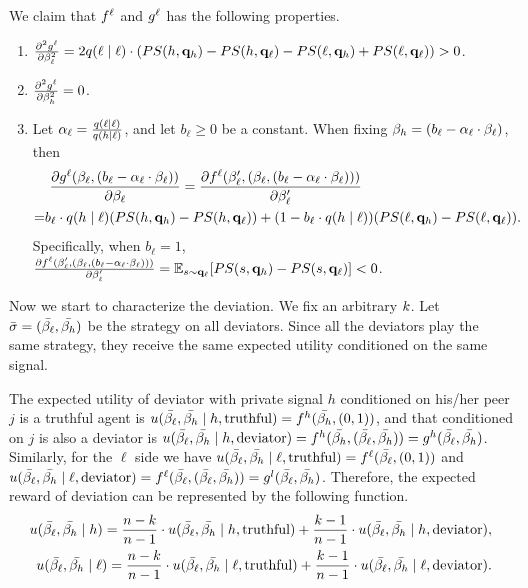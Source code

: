 \begin{claim}
We claim that $f^\ell$ and $g^\ell$ has the following properties. 
    \begin{enumerate}
        \item $\frac{\partial^2g^\ell}{\partial \beta_{\ell}^2} = 2q(\ell\mid \ell)\cdot (PS(h, \mathbf{q}_h) - PS(h, \mathbf{q}_\ell) - PS(\ell,\mathbf{q}_h) + PS(\ell, \mathbf{q}_\ell)) > 0$. 
        \item $\frac{\partial^2g^\ell}{\partial \beta_{h}^2} = 0$. 
        \item Let $\alpha_\ell = \frac{q(\ell \mid \ell)}{q(h \mid \ell)}$, and let $b_\ell \ge 0$ be a constant. When fixing $\beta_{h} = (b_\ell - \alpha_\ell 
 \cdot\beta_{\ell})$, then 
        \begin{align*}
        &\ \frac{\partial g^\ell(\beta_{\ell}, (b_\ell - \alpha_\ell 
        \cdot\beta_{\ell}))}{\partial \beta_{\ell}}= \frac{\partial f^\ell(\beta_{\ell}', (\beta_{\ell}, (b_\ell - \alpha_\ell 
        \cdot\beta_{\ell})))}{\partial \beta_{\ell}'}\\ =& b_\ell \cdot q(h\mid \ell)(PS(h, \mathbf{q}_h) - PS(h, \mathbf{q}_\ell)) + (1 - b_\ell \cdot q(h\mid \ell)) (PS(\ell, \mathbf{q}_h) - PS(\ell, \mathbf{q}_\ell)). 
        \end{align*}
        Specifically, when $b_\ell =1$, $\frac{\partial f^\ell(\beta_{\ell}', (\beta_{\ell}, (b_\ell - \alpha_\ell 
 \cdot\beta_{\ell})))}{\partial \beta_{\ell}'} = \mathbb{E}_{s\sim \mathbf{q}_{\ell}}[PS(s, \mathbf{q}_{h}) - PS(s, \mathbf{q}_{\ell})] < 0$.
    \end{enumerate}
\end{claim}

Now we start to characterize the deviation.
We fix an arbitrary $k$. Let $\bar{\sigma} = (\bar{\beta_{\ell}}, \bar{\beta_{h}})$ be the strategy on all deviators. Since all the deviators play the same strategy, they receive the same expected utility conditioned on the same signal. 

The expected utility of deviator with private signal $h$ conditioned on his/her peer $j$ is a truthful agent is $u(\bar{\beta_{\ell}}, \bar{\beta_{h}} \mid h, \text{truthful}) = f^h(\bar{\beta_{h}}, (0, 1))$, and that conditioned on $j$ is also a deviator is $u(\bar{\beta_{\ell}}, \bar{\beta_{h}} \mid h, \text{deviator}) = f^h(\bar{\beta_{h}}, (\bar{\beta_{\ell}}, \bar{\beta_{h}})) = g^h(\bar{\beta_{\ell}}, \bar{\beta_{h}})$. Similarly, for the $\ell$ side we have $u(\bar{\beta_{\ell}}, \bar{\beta_{h}} \mid \ell, \text{truthful}) = f^\ell(\bar{\beta_{\ell}}, (0, 1))$ and $u(\bar{\beta_{\ell}}, \bar{\beta_{h}} \mid \ell, \text{deviator}) = f^\ell(\bar{\beta_{\ell}}, (\bar{\beta_{\ell}}, \bar{\beta_{h}})) = g^l(\bar{\beta_{\ell}}, \bar{\beta_{h}})$. Therefore, the expected reward of deviation can be represented by the following function. 
\begin{align*}
    u(\bar{\beta_{\ell}}, \bar{\beta_{h}} \mid h) = \frac{n-k}{n - 1} \cdot u(\bar{\beta_{\ell}}, \bar{\beta_{h}} \mid h, \text{truthful}) + \frac{k - 1}{n - 1} \cdot u(\bar{\beta_{\ell}}, \bar{\beta_{h}} \mid h, \text{deviator}),\\
     u(\bar{\beta_{\ell}}, \bar{\beta_{h}} \mid \ell) =  \frac{n-k}{n - 1} \cdot u(\bar{\beta_{\ell}}, \bar{\beta_{h}} \mid \ell, \text{truthful}) + \frac{k - 1}{n - 1} \cdot u(\bar{\beta_{\ell}}, \bar{\beta_{h}} \mid \ell, \text{deviator}).
\end{align*}


